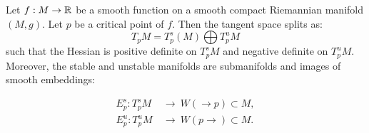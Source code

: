 \begin{theorem} \label{thm:morse-stableAndUnstableManifoldTheorem}
	Let $f:M\to \mathbb{R}$ be a smooth function on a smooth compact Riemannian manifold $(M,g)$. Let $p$ be a critical point of $f$. Then the tangent space splits as:
	\begin{equation*}
		T_pM=T^s_p(M) \bigoplus T^u_pM
	\end{equation*} such that the Hessian is positive definite on $T^s_pM$ and negative definite on $T^u_pM$. Moreover, the stable and unstable manifolds are submanifolds and images of smooth embeddings: 
	
	\begin{align*}
		E^s_p:T^s_pM ~ &\to ~  W(\to p) \subset M, \\
		E^u_p:T^u_pM~&\to~     W(p \to) \subset M.
	\end{align*}
\end{theorem}
